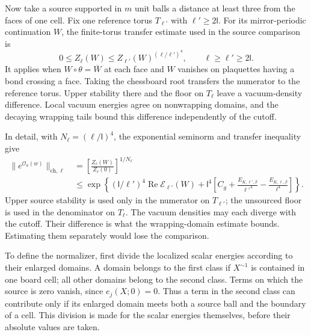 \documentclass[11pt,letterpaper,reqno]{amsart}
\theoremstyle{definition}
\theoremstyle{remark}
\newcommand{\cO}{\mathcal O}
\begin{document}
Now take a source supported in $m$ unit balls a distance at least three
from the faces of one cell. Fix one reference torus $T_{\ell'}$ with
$\ell'\ge2\mathsf l$. For its mirror-periodic continuation $W$, the
finite-torus transfer estimate used in the source comparison is
\begin{equation}\label{eq:source-torus-transfer}
 0\le Z_\ell(W)\le Z_{\ell'}(W)^{(\ell/\ell')^4},
 \qquad \ell\ge\ell'\ge2\mathsf l.
\end{equation}
It applies when $W\circ\theta=\overline W$ at each face and $W$
vanishes on plaquettes having a bond crossing a face. Taking the
chessboard root transfers the numerator to the reference torus.
Upper stability there and the floor on $T_\ell$ leave a vacuum-density
difference. Local vacuum energies agree on nonwrapping domains, and
the decaying wrapping tails bound this difference independently of the
cutoff.

In detail, with $N_\ell=(\ell/\mathsf l)^4$, the exponential
seminorm and transfer inequality give
\begin{align*}
 \|e^{\cO_a(w)}\|_{\mathrm{ch},\ell}
  &=\left[\frac{Z_\ell(W)}{Z_\ell(0)}\right]^{1/N_\ell}\\
  &\le\exp\left\{(\mathsf l/\ell')^4
                         \operatorname{Re}\mathcal E_{\ell'}(W)
        +\mathsf l^4\left[
             C_g+\frac{E_{K,\ell',\beta}}{\ell'^4}
                    -\frac{E_{K,\ell,\beta}}{\ell^4}\right]\right\}.
\end{align*}
Upper source stability is used only in the numerator on $T_{\ell'}$;
the unsourced floor is used in the denominator on $T_\ell$. The
vacuum densities may each diverge with the cutoff. Their difference
is what the wrapping-domain estimate bounds. Estimating them
separately would lose the comparison.

To define the normalizer, first divide the localized scalar energies
according to their enlarged domains. A domain belongs to the first
class if $X^{\sim1}$ is contained in one board cell; all other
domains belong to the second class. Terms on which the source is zero
vanish, since $e_j(X;0)=0$. Thus a term in the second class can
contribute only if its enlarged domain meets both a source ball and
the boundary of a cell. This division is made for the scalar energies
themselves, before their absolute values are taken.
\end{document}

